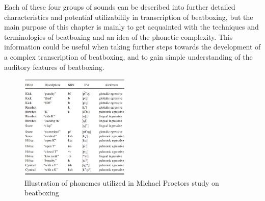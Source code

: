 Each of these four groups of sounds can be described into further detailed characteristics and potential utilizabilily in transcription of beatboxing, but the main purpose of this chapter is mainly to get acquainted with the techniques and terminologies of beatboxing and an idea of the phonetic complexity. This information could be useful when taking further steps towards the development of a complex transcription of beatboxing, and to gain simple understanding of the auditory features of beatboxing.
\begin{figure}[h]
	\begin{center}
		\includegraphics[height=5cm]{fig/phonemes.JPG}
		\caption{Illustration of phonemes utilized in Michael Proctors study on beatboxing \citep{proctor2012}}
		\label{VoiceBand}
	\end{center}
\end{figure}
